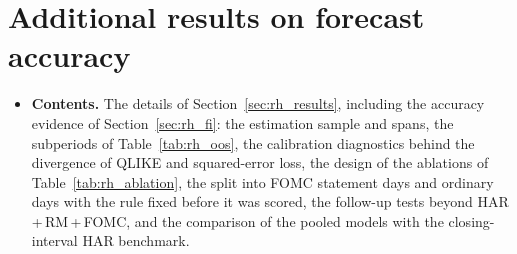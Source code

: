 \section{Additional results on forecast accuracy}
\label{app:rh_results}
\begin{itemize}
\item \textbf{Contents.} The details of Section~\ref{sec:rh_results}, including the accuracy evidence of
  Section~\ref{sec:rh_fi}: the estimation sample and spans, the subperiods of Table~\ref{tab:rh_oos}, the calibration
  diagnostics behind the divergence of QLIKE and squared-error loss, the design of the ablations of
  Table~\ref{tab:rh_ablation}, the split into FOMC statement days and ordinary days with the rule fixed before it was
  scored, the follow-up tests beyond HAR\,+\,RM\,+\,FOMC, and the comparison of the pooled models with the
  closing-interval HAR benchmark.
\end{itemize}


